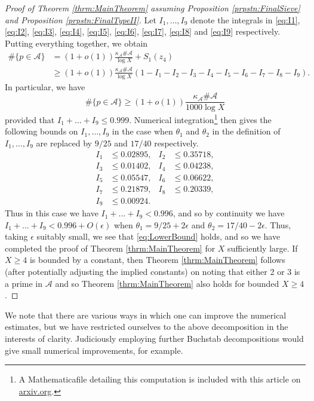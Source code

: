 \documentclass[10pt]{amsart}
\theoremstyle{plain}
\numberwithin{sblmm}{thrm}
\numberwithin{equation}{section}
\begin{document}
\begin{proof}[Proof of Theorem \ref{thrm:MainTheorem} assuming Proposition \ref{prpstn:FinalSieve} and Proposition \ref{prpstn:FinalTypeII}]
Let $I_1,\dots,I_9$ denote the integrals in \eqref{eq:I1}, \eqref{eq:I2}, \eqref{eq:I3}, \eqref{eq:I4}, \eqref{eq:I5}, \eqref{eq:I6}, \eqref{eq:I7}, \eqref{eq:I8} and \eqref{eq:I9} respectively. Putting everything together, we obtain
%
\begin{align*}
\#\{p\in\mathcal{A}{}\}&=(1+o(1))\frac{\kappa_{\mathcal{A}}\#\mathcal{A}{}}{\log{X}}+S_1(z_4)\\
&\ge (1+o(1))\frac{\kappa_{\mathcal{A}}\#\mathcal{A}{}}{\log{X}}(1-I_1-I_2-I_3-I_4-I_5-I_6-I_7-I_8-I_9).
\end{align*}
%
In particular, we have
%
\begin{equation}
\#\{p\in\mathcal{A}{}\}\ge (1+o(1))\frac{\kappa_{\mathcal{A}}\#\mathcal{A}{}}{1000\log{X}}
\label{eq:LowerBound}
\end{equation}
%
provided that $I_1+\dots+I_9\le 0.999$. Numerical integration\footnote{A Mathematica\textregistered\;file detailing this computation is included with this article on \url{arxiv.org}.} then gives the following bounds on $I_1,\dots,I_9$ in the case when $\theta_1$ and $\theta_2$ in the definition of $I_1,\dots,I_9$ are replaced by $9/25$ and $17/40$ respectively.
%
\begin{align*}
I_1 & \le 0.02895, & I_2 & \le 0.35718, \\
I_3 & \le 0.01402, & I_4 & \le 0.04238, \\
I_5 & \le 0.05547,& I_6 & \le 0.06622,\\
I_7 & \le 0.21879,& I_8 & \le 0.20339,\\
I_9 & \le 0.00924.
\end{align*}
%
Thus in this case we have $I_1+\dots +I_9< 0.996$, and so by continuity we have $I_1+\dots +I_9< 0.996+O(\epsilon)$ when $\theta_1=9/25+2\epsilon$ and $\theta_2=17/40-2\epsilon$. Thus, taking $\epsilon$ suitably small, we see that \eqref{eq:LowerBound} holds, and so we have completed the proof of Theorem \ref{thrm:MainTheorem} for $X$ sufficiently large. If $X\ge 4$ is bounded by a constant, then Theorem \ref{thrm:MainTheorem} follows (after potentially adjusting the implied constants) on noting that either 2 or 3 is a prime in $\mathcal{A}$ and so Theorem \ref{thrm:MainTheorem} also holds for bounded $X\ge 4$.
\end{proof}
%
%
%
%
We note that there are various ways in which one can improve the numerical estimates, but we have restricted ourselves to the above decomposition in the interests of clarity. Judiciously employing further Buchstab decompositions would give small numerical improvements, for example.
\end{document}
